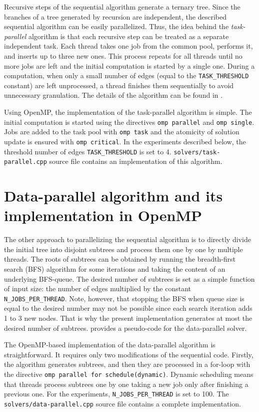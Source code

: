 \documentclass[epsf,epic,eepic,eepicemu]{article}
\newcommand{\var}{\texttt}
\begin{document}
Recursive steps of the sequential algorithm generate a ternary tree.
Since the branches of a tree generated by recursion are independent, the described sequential algorithm can be easily parallelized. Thus, the idea behind the \textit{task-parallel} algorithm is that each recursive step can be treated as a separate independent task. Each thread takes one job from the common pool, performs it, and inserts up to three new ones. This process repeats for all threads until no more jobs are left and the initial computation is started by a single one. During a computation, when only a small number of edges (equal to the \var{TASK\_THRESHOLD} constant) are left unprocessed, a thread finishes them sequentially to avoid unnecessary granulation. The details of the algorithm can be found in .

Using OpenMP, the implementation of the task-parallel algorithm is simple. The initial computation is started using the directives \texttt{omp parallel} and \texttt{omp single}. Jobs are added to the task pool with \texttt{omp task} and the atomicity of solution update is ensured with \texttt{omp critical}. In the experiments described below, the threshold number of edges \var{TASK\_THRESHOLD} is set to 4. \texttt{solvers/task-parallel.cpp} source file contains an implementation of this algorithm.

\section{Data-parallel algorithm and its implementation in OpenMP}
\label{sec:data-parallel}

The other approach to parallelizing the sequential algorithm is to directly divide the initial tree into disjoint subtrees and process them one by one by multiple threads. The roots of subtrees can be obtained by running the breadth-first search (BFS) algorithm for some iterations and taking the content of an underlying BFS-queue. The desired number of subtrees is set as a simple function of input size: the number of edges multiplied by the constant \var{N\_JOBS\_PER\_THREAD}. Note, however, that stopping the BFS when queue size is equal to the desired number may not be possible since each search iteration adds 1 to 3 new nodes. That is why the present implementation generates at most the desired number of subtrees.  provides a pseudo-code for the data-parallel solver.

The OpenMP-based implementation of the data-parallel algorithm is straightforward. It requires only two modifications of the sequential code. Firstly, the algorithm generates subtrees, and then they are processed in a for-loop with the directive \texttt{omp parallel for schedule(dynamic)}. Dynamic scheduling means that threads process subtrees one by one taking a new job only after finishing a previous one. For the experiments, \var{N\_JOBS\_PER\_THREAD} is set to 100. The \texttt{solvers/data-parallel.cpp} source file contains a complete implementation.
\end{document}

